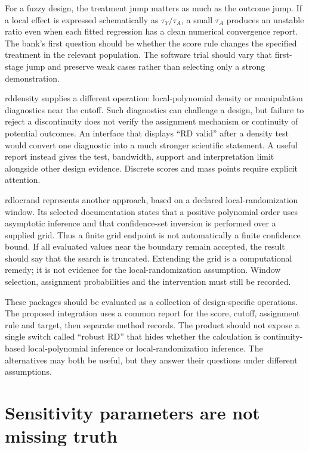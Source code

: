 For a fuzzy design, the treatment jump matters as much as the outcome jump.
If a local effect is expressed schematically as \(\tau_Y/\tau_A\), a small
\(\tau_A\) produces an unstable ratio even when each fitted regression has a
clean numerical convergence report. The bank's first question should be
whether the score rule changes the specified treatment in the relevant
population. The software trial should vary that first-stage jump and preserve
weak cases rather than selecting only a strong demonstration.

rddensity supplies a different operation: local-polynomial density or
manipulation diagnostics near the cutoff. Such diagnostics can challenge a
design, but failure to reject a discontinuity does not verify the assignment
mechanism or continuity of potential outcomes. An interface that displays
``RD valid'' after a density test would convert one diagnostic into a much
stronger scientific statement. A useful report instead gives the test,
bandwidth, support and interpretation limit alongside other design evidence.
Discrete scores and mass points require explicit attention. \citep{v12_sw_rddensity}

rdlocrand represents another approach, based on a declared local-randomization
window. Its selected documentation states that a positive polynomial order
uses asymptotic inference and that confidence-set inversion is performed over
a supplied grid. Thus a finite grid endpoint is not automatically a finite
confidence bound. If all evaluated values near the boundary remain accepted,
the result should say that the search is truncated. Extending the grid is a
computational remedy; it is not evidence for the local-randomization assumption.
Window selection, assignment probabilities and the intervention must still be
recorded. \citep{v12_sw_rdlocrand}

These packages should be evaluated as a collection of design-specific
operations. The proposed integration uses a common report for the score,
cutoff, assignment rule and target, then separate method records. The product
should not expose a single switch called ``robust RD'' that hides whether the
calculation is continuity-based local-polynomial inference or local-randomization
inference. The alternatives may both be useful, but they answer their questions
under different assumptions.

\section{Sensitivity parameters are not missing truth}

